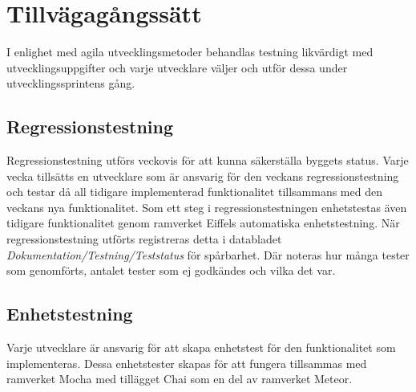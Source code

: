 \section{Tillvägagångssätt}
I enlighet med agila utvecklingsmetoder behandlas testning likvärdigt med utvecklingsuppgifter och varje utvecklare väljer och utför dessa under utvecklingssprintens gång. \\
\subsection{Regressionstestning}
Regressionstestning utförs veckovis för att kunna säkerställa byggets status. Varje vecka tillsätts en utvecklare som är ansvarig för den veckans regressionstestning och testar då all tidigare implementerad funktionalitet tillsammans med den veckans nya funktionalitet. Som ett steg i regressionstestningen enhetstestas även tidigare funktionalitet genom ramverket Eiffels automatiska enhetstestning. När regressionstestning utförts registreras detta i databladet \textit{Dokumentation/Testning/Teststatus} för spårbarhet. Där noteras hur många tester som genomförts, antalet tester som ej godkändes och vilka det var. 
\\
\subsection{Enhetstestning}
Varje utvecklare är ansvarig för att skapa enhetstest för den funktionalitet som implementeras. Dessa enhetstester skapas för att fungera tillsammas med ramverket Mocha\cite{website:mocha} med tillägget Chai\cite{website:mocha} som en del av ramverket Meteor\cite{website:meteor}. 

